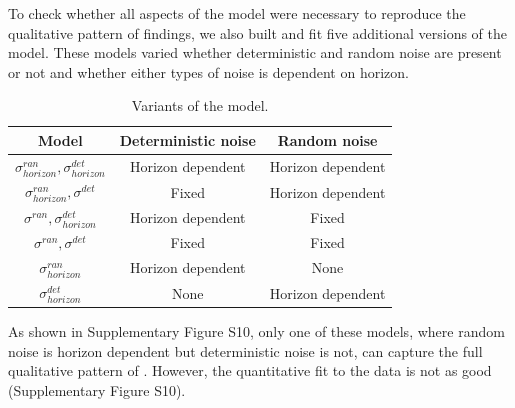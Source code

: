 \documentclass[12pt]{article}
\begin{document}
	To check whether all aspects of the model were necessary to reproduce the qualitative pattern of findings, we also built and fit five additional versions of the model. These models varied  whether deterministic and random noise are present or not and whether either types of noise is dependent on horizon. 
	
	\begin{table}[h]
		\small
		\centering
		\begin{tabular}{|c|c|c|}
			\hline
			Model & Deterministic noise & Random noise \\
			\hline
			$\sigma^{ran}_{horizon},\sigma^{det}_{horizon}$  & Horizon dependent & Horizon dependent\\
			\hline
			$\sigma^{ran}_{horizon},\sigma^{det}_{}$ & Fixed & Horizon dependent\\
			\hline
			$\sigma^{ran}_{},\sigma^{det}_{horizon}$ & Horizon dependent & Fixed\\
			\hline
			$\sigma^{ran}_{},\sigma^{det}_{}$ & Fixed & Fixed\\
			\hline
			$\sigma^{ran}_{horizon}$ & Horizon dependent & None\\
			\hline
			$\sigma^{det}_{horizon}$ & None & Horizon dependent\\
			\hline
		\end{tabular}
		\caption{Variants of the model.}
		\label{tab:models}	
	\end{table}
	As shown in Supplementary Figure S10, only one of these models, where random noise is horizon dependent but deterministic noise is not, can capture the full qualitative pattern of . However, the quantitative fit to the data is not as good (Supplementary Figure S10).%
	
\end{document}

